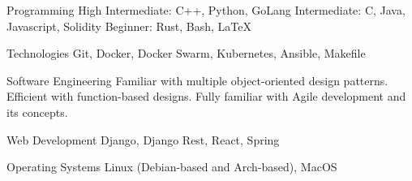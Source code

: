 

\begin{cvskills}

  \cvskill
    {Programming} %
    {High Intermediate: C++, Python, GoLang \newline Intermediate: C, Java, Javascript, Solidity \newline Beginner: Rust, Bash, LaTeX } %

  \cvskill
    {Technologies} %
    {Git, Docker, Docker Swarm, Kubernetes, Ansible, Makefile} %

  \cvskill
    {Software Engineering} %
    {Familiar with multiple object-oriented design patterns. Efficient with function-based designs. Fully familiar with Agile development and its concepts.} %

  \cvskill
    {Web Development} %
    {Django, Django Rest, React, Spring} %

  
  \cvskill
    {Operating Systems} %
    {Linux (Debian-based and Arch-based), MacOS} %

\end{cvskills}
